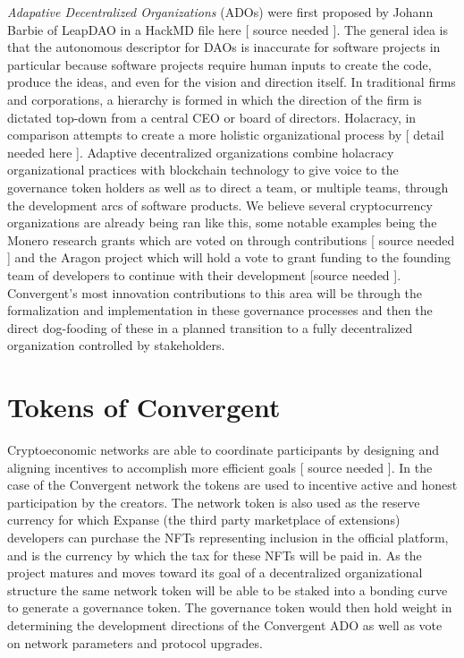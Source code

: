 \documentclass[a4paper, 10pt]{article}
\begin{document}
\textit{Adapative Decentralized Organizations} (ADOs) were first proposed by Johann Barbie of LeapDAO in a HackMD file here [ source needed ]. The general idea is that the autonomous descriptor for DAOs is inaccurate for software projects in particular because software projects require human inputs to create the code, produce the ideas, and even for the vision and direction itself. In traditional firms and corporations, a hierarchy is formed in which the direction of the firm is dictated top-down from a central CEO or board of directors. Holacracy, in comparison attempts to create a more holistic organizational process by [ detail needed here ]. Adaptive decentralized organizations combine holacracy organizational practices with blockchain technology to give voice to the governance token holders as well as to direct a team, or multiple teams, through the development arcs of software products. We believe several cryptocurrency organizations are already being ran like this, some notable examples being the Monero research grants which are voted on through contributions [ source needed ] and the Aragon project which will hold a vote to grant funding to the founding team of developers to continue with their development [source needed ]. Convergent's most innovation contributions to this area will be through the formalization and implementation in these governance processes and then the direct dog-fooding of these in a planned transition to a fully decentralized organization controlled by stakeholders.

\section{Tokens of Convergent}

Cryptoeconomic networks are able to coordinate participants by designing and aligning incentives to accomplish more efficient goals [ source needed ]. In the case of the Convergent network the tokens are used to incentive active and honest participation by the creators. The network token is also used as the reserve currency for which Expanse (the third party marketplace of extensions) developers can purchase the NFTs representing inclusion in the official platform, and is the currency by which the tax for these NFTs will be paid in. As the project matures and moves toward its goal of a decentralized organizational structure the same network token will be able to be staked into a bonding curve to generate a governance token. The governance token would then hold weight in determining the development directions of the Convergent ADO as well as vote on network parameters and protocol upgrades. 
\end{document}
